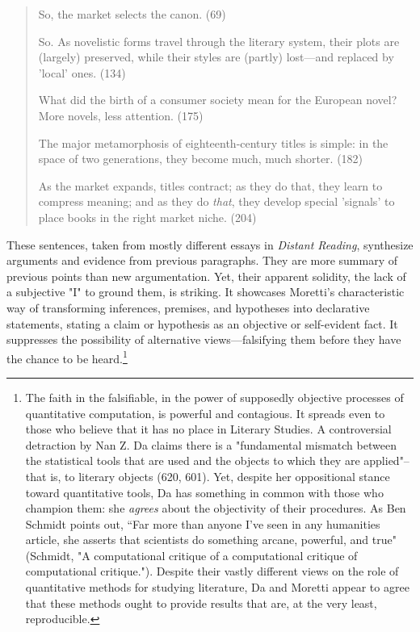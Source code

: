 \documentclass[11pt]{article}
\begin{document}
\begin{quote}
So, the market selects the canon. (69)

So. As novelistic forms travel through the literary system, their
plots are (largely) preserved, while their styles are (partly)
lost---and replaced by 'local' ones. (134)

What did the birth of a consumer society mean for the European novel?
More novels, less attention. (175)

The major metamorphosis of eighteenth-century titles is simple: in the
space of two generations, they become much, much shorter. (182)

As the market expands, titles contract; as they do that, they learn to
compress meaning; and as they do \emph{that}, they develop special
'signals' to place books in the right market niche. (204)
\end{quote}

These sentences, taken from mostly different essays in \emph{Distant
Reading}, synthesize arguments and evidence from previous paragraphs.
They are more summary of previous points than new argumentation. Yet,
their apparent solidity, the lack of a subjective "I" to ground them,
is striking. It showcases Moretti's characteristic way of transforming
inferences, premises, and hypotheses into declarative statements,
stating a claim or hypothesis as an objective or self-evident fact. It
suppresses the possibility of alternative views---falsifying them
before they have the chance to be heard.\footnote{The faith in the falsifiable, in the power of supposedly
objective processes of quantitative computation, is powerful and
contagious. It spreads even to those who believe that it has no place
in Literary Studies. A controversial detraction by Nan Z. Da claims
there is a "fundamental mismatch between the statistical tools that
are used and the objects to which they are applied"--that is, to
literary objects (620, 601). Yet, despite her oppositional stance
toward quantitative tools, Da has something in common with those who
champion them: she \emph{agrees} about the objectivity of their procedures.
As Ben Schmidt points out, “Far more than anyone I’ve seen in any
humanities article, she asserts that scientists do something arcane,
powerful, and true" (Schmidt, "A computational critique of a
computational critique of computational critique."). Despite their
vastly different views on the role of quantitative methods for
studying literature, Da and Moretti appear to agree that these methods
ought to provide results that are, at the very least, reproducible.}
\end{document}
